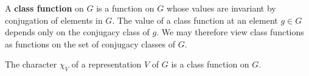 \begin{defn}
A \textbf{class function} on $G$ is a function on $G$ whose values are invariant by conjugation of elements in $G$.  The value of a class function at an element $g \in G$ depends only on the conjugacy class of $g$.  We may therefore view class functions as functions on the set of conjugacy classes of $G$.
\end{defn}
\begin{note}
The character $\chi_V$ of a representation $V$ of $G$ is a class function on $G$.
\end{note}